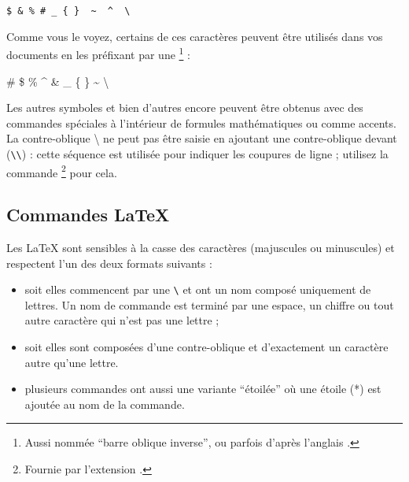\begin{code}
\verb.$ & % # _ { }  ~  ^  \ . %
 \end{code}

Comme vous le voyez, certains de ces caractères peuvent être utilisés
dans vos documents en les préfixant par une \footnote{Aussi nommée
  \enquote{barre oblique inverse}, ou parfois  d'après l'anglais
  . \NdT } :

\begin{example}
\# \$ \% \^{} \& \_ \{ \} \~{}
\textbackslash
\end{example}

Les autres symboles et bien d'autres encore peuvent être obtenus avec des
commandes spéciales à l'intérieur de formules mathématiques ou comme
accents. La contre-oblique \textbackslash{} ne peut pas être saisie en ajoutant
une contre-oblique devant (\verb|\\|) : cette séquence est utilisée pour
indiquer les coupures de ligne ; utilisez la commande
\footnote{Fournie par l'extension . \NdT} pour
cela.

\subsection{Commandes \LaTeX{}}

Les  \LaTeX{} sont sensibles à la casse des caractères
(majuscules ou minuscules) et respectent l'un des deux formats
suivants :

\begin{itemize}
\item soit elles commencent par une  \verb|\| et ont un
      nom composé uniquement de lettres. Un nom de commande est
      terminé par une espace, un chiffre ou tout autre caractère qui
      n'est pas une lettre ;
\item soit elles sont composées d'une contre-oblique et d'exactement
  un caractère autre qu'une lettre.
\item plusieurs commandes ont aussi une variante \enquote{étoilée} où
  une étoile (*) est ajoutée au nom de la commande.
\end{itemize}

%
%

